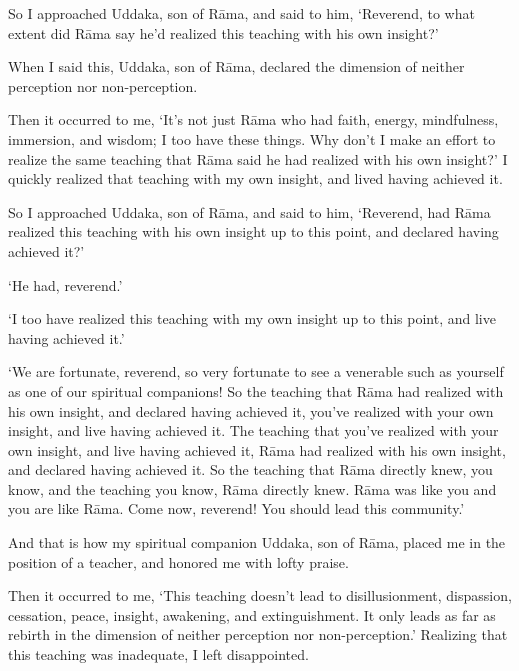 \documentclass[12pt,openany]{book}%
\begin{document}
So I approached Uddaka, son of \textsanskrit{Rāma}, and said to him, ‘Reverend, to what extent did \textsanskrit{Rāma} say he’d realized this teaching with his own insight?’ 

When I said this, Uddaka, son of \textsanskrit{Rāma}, declared the dimension of neither perception nor non-perception. 

Then it occurred to me, ‘It’s not just \textsanskrit{Rāma} who had faith, energy, mindfulness, immersion, and wisdom; I too have these things. Why don’t I make an effort to realize the same teaching that \textsanskrit{Rāma} said he had realized with his own insight?’ I quickly realized that teaching with my own insight, and lived having achieved it. 

So I approached Uddaka, son of \textsanskrit{Rāma}, and said to him, ‘Reverend, had \textsanskrit{Rāma} realized this teaching with his own insight up to this point, and declared having achieved it?’ 

‘He had, reverend.’ 

‘I too have realized this teaching with my own insight up to this point, and live having achieved it.’ 

‘We are fortunate, reverend, so very fortunate to see a venerable such as yourself as one of our spiritual companions! So the teaching that \textsanskrit{Rāma} had realized with his own insight, and declared having achieved it, you’ve realized with your own insight, and live having achieved it. The teaching that you’ve realized with your own insight, and live having achieved it, \textsanskrit{Rāma} had realized with his own insight, and declared having achieved it. So the teaching that \textsanskrit{Rāma} directly knew, you know, and the teaching you know, \textsanskrit{Rāma} directly knew. \textsanskrit{Rāma} was like you and you are like \textsanskrit{Rāma}. Come now, reverend! You should lead this community.’ 

And that is how my spiritual companion Uddaka, son of \textsanskrit{Rāma}, placed me in the position of a teacher, and honored me with lofty praise. 

Then it occurred to me, ‘This teaching doesn’t lead to disillusionment, dispassion, cessation, peace, insight, awakening, and extinguishment. It only leads as far as rebirth in the dimension of neither perception nor non-perception.’ Realizing that this teaching was inadequate, I left disappointed. 
\end{document}
